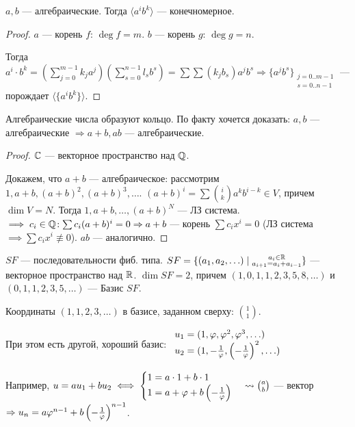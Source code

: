 \begin{statement}
    $a, b$ --- алгебраические. Тогда  $\langle a^i b^k \rangle$ --- конечномерное. 
\end{statement}
\begin{proof}
    $a$ --- корень  $f$:  $\deg f = m$.  $b$ --- корень  $g$:  $\deg g = n$.
    
    Тогда  $a^i \cdot b^k = (\sum\limits_{j=0}^{m-1} k_j a^j)(\sum\limits_{s=0}^{n-1} l_s b^s) = \sum \sum (k_j b_s)a^j b^s \Rightarrow \{ a^j b^s\}_{\substack{j = 0..m-1 \\ s = 0..n-1}}$ --- порождает  $\langle \{a^i b^k\} \rangle$.
\end{proof}
\begin{theorem}
    Алгебраические числа образуют кольцо. По факту хочется доказать: $a, b$ --- алгебраические  $\Rightarrow a + b, ab$ --- алгебраические.
\end{theorem}
\begin{proof}
    $\mathbb{C}$ --- векторное пространство над  $\mathbb{Q}$. 

    Докажем, что $a+b$ --- алгебраическое: рассмотрим  $1, a+b, (a+b)^2, (a+b)^3, \ldots$. $(a+b)^i = \sum \binom{i}{k} a^k b^{i-k} \in V$, причем  $\dim V = N$. Тогда  $1, a+b, \ldots, (a+b)^N$ --- ЛЗ система. $\implies c_i \in \mathbb{Q}\!: \sum c_i(a+b)^i = 0 \Rightarrow a+b$ --- корень  $\sum c_i x^i = 0$ (ЛЗ система $\implies \sum c_ix^i \not\equiv 0$).  $ab$ --- аналогично.
\end{proof}

\begin{example}
    $SF$ --- последовательности фиб. типа.  $SF = \{ (a_1, a_2, \ldots) \mid \substack{a_i \in \mathbb{R} \\ a_{i+1} = a_i + a_{i-1}} \} $ --- векторное пространство над $\mathbb{R}$.  $\dim SF = 2$, причем  $(1, 0, 1, 1, 2, 3, 5, 8, \ldots)$ и $(0, 1, 1, 2, 3, 5, \ldots)$ --- Базис $SF$. 

    Координаты  $(1, 1, 2, 3, \ldots)$ в базисе, заданном сверху: $\binom{1}{1}$. 

    При этом есть другой, хороший базис:  $\begin{array}{l} u_1 = (1, \varphi, \varphi^2, \varphi^3, \ldots) \\ u_2 =(1, -\frac{1}{\varphi}, \left(-\frac{1}{\varphi}\right)^2, \ldots ) \end{array}$

    Например, $u = au_1 + bu_2 \iff \begin{cases} 1 = a\cdot 1 + b\cdot1 \\ 1 = a + \varphi  + b \left(-\frac{1}{\varphi}\right) \end{cases} \leadsto \binom{a}{b}$ --- вектор $\Rightarrow u_n = a \varphi^{n-1} + b \left(-\frac{1}{\varphi}\right)^{n-1}$. 
\end{example}

